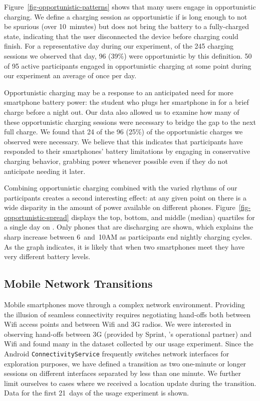 Figure~\ref{fig-opportunistic-patterns} shows that many users engage in
opportunistic charging. We define a charging session as opportunistic if is
long enough to not be spurious (over 10~minutes) but does not bring the
battery to a fully-charged state, indicating that the user disconnected the
device before charging could finish. For a representative day during our
experiment, of the 245 charging sessions we observed that day, 96 (39\%) were
opportunistic by this definition. 50 of 95 active participants engaged in
opportunistic charging at some point during our experiment an average of once
per day.

Opportunistic charging may be a response to an anticipated need for more
smartphone battery power: the student who plugs her smartphone in for a brief
charge before a night out. Our data also allowed us to examine how many of
these opportunistic charging sessions were necessary to bridge the gap to the
next full charge. We found that 24 of the 96 (25\%) of the opportunistic
charges we observed were necessary. We believe that this indicates that
participants have responded to their smartphones' battery limitations by
engaging in conservative charging behavior, grabbing power whenever possible
even if they do not anticipate needing it later.

Combining opportunistic charging combined with the varied rhythms of our
participants creates a second interesting effect: at any given point on
\PhoneLab{} there is a wide disparity in the amount of power available on
different phones. Figure~\ref{fig-opportunistic-spread} displays the top,
bottom, and middle (median) quartiles for a single day on \PhoneLab{}. Only
phones that are discharging are shown, which explains the sharp increase
between 6~and~10AM as participants end nightly charging cycles.  As the graph
indicates, it is likely that when two smartphones meet they have very
different battery levels.

\subsection{Mobile Network Transitions}
\label{subsec-networktransitions}

Mobile smartphones move through a complex network environment. Providing the
illusion of seamless connectivity requires negotiating hand-offs both between
Wifi access points and between Wifi and 3G radios. We were interested in
observing hand-offs between 3G (provided by Sprint, \PhoneLab{}'s operational
partner) and Wifi and found many in the dataset collected by our usage
experiment. Since the Android \texttt{ConnectivityService} frequently
switches network interfaces for exploration purposes, we have defined a
transition as two one-minute or longer sessions on different interfaces
separated by less than one minute. We further limit ourselves to cases where
we received a location update during the transition. Data for the first
21~days of the usage experiment is shown.

